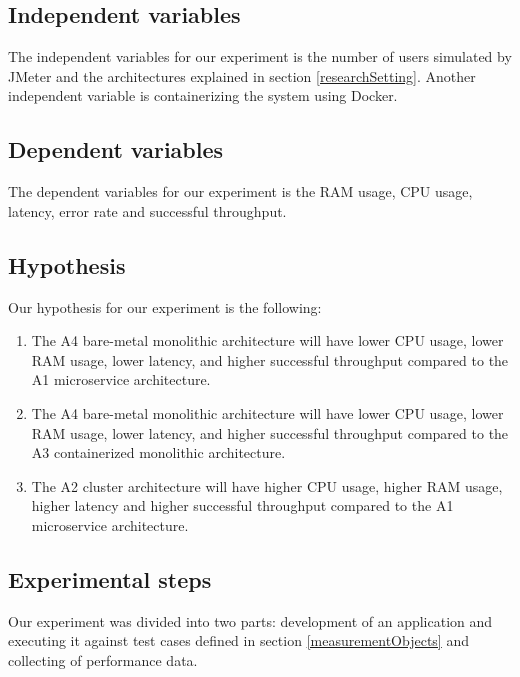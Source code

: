 \documentclass[a4paper,oneside]{bth}
\begin{document}

\clearpage
\par\vspace {0.5cm}

\subsection{Independent variables}
The independent variables for our experiment is the number of users simulated by JMeter and the architectures explained in section \ref{researchSetting}.
Another independent variable is containerizing the system using Docker.
\subsection{Dependent variables}
The dependent variables for our experiment is the RAM usage, CPU usage, latency, error rate and successful throughput.

\subsection{Hypothesis}
Our hypothesis for our experiment is the following:

\begin{enumerate}[label=RQ\arabic*]

\item The A4 bare-metal monolithic architecture will have lower CPU usage, lower RAM usage, lower latency, and higher successful throughput compared to the A1 microservice architecture.

\item  The A4 bare-metal monolithic architecture will have lower CPU usage, lower RAM usage, lower latency, and higher successful throughput compared to the A3 containerized monolithic architecture.

\item The A2 cluster architecture will have higher CPU usage, higher RAM usage, higher latency and higher successful throughput compared to the A1 microservice architecture.

\end{enumerate}

\subsection{Experimental steps}

Our experiment was divided into two parts: development of an application and executing it against test cases defined in section \ref{measurementObjects} and collecting of performance data.
\end{document}

